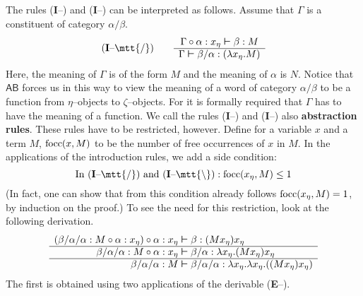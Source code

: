 The rules (\textbf{I}--{\mtt{\tf}}) and (\textbf{I}--{\mtt{\tb}}) 
can be interpreted as follows. Assume that $\Gamma$ is a constituent of
category $\alpha/\beta$. 
\begin{equation}
\mbox{\rm (\textbf{I}--{\mtt{\tf}})}\qquad
\begin{array}{c}
\Gamma \circ \alpha : x_{\eta} \bvdash \beta : M
    \\\hline
\Gamma \bvdash \beta/\alpha :
    (\lambda x_{\eta}. M)
\end{array} 
\end{equation}
Here, the meaning of $\Gamma$ is of the form $M$ and the
meaning of $\alpha$ is $N$. Notice that $\mathsf{AB}$ forces us 
in this way to view the meaning of a word of category $\alpha/\beta$ 
to be a function from $\eta$--objects to $\zeta$--objects.
For it is formally required that $\Gamma$ has to have the
meaning of a function. We call the rules (\textbf{I}--{\mtt{\tf}}) 
and (\textbf{I}--{\mtt{\tb}}) also \textbf{abstraction rules}.
These rules have to be restricted, however. Define for a variable 
$x$ and a term $M$, 
$\operatorname{focc}(x,M)$ to be the number of free occurrences of $x$ in $M$.
In the applications of the introduction rules, we add a side 
condition: 
\begin{equation}
\text{In }\mbox{\rm (\textbf{I}--{\mtt{\tf}})} \text{ and }
\mbox{\rm (\textbf{I}--{\mtt{\tb}})} : 
\focc(x_{\eta},M) \leq 1 
\end{equation}
(In fact, one can show that from this condition already follows 
$\operatorname{focc}(x_{\eta},M) = 1$, by induction on the proof.) To see the 
need for this restriction, look at the following derivation.
$$\begin{array}{r@{\;\bvdash\;}l}
(\beta/\alpha/\alpha : M \circ \alpha : x_{\eta}) \circ 
	\alpha : x_{\eta} & \beta : (Mx_{\eta})x_{\eta} \\\hline
\beta/\alpha/\alpha : M \circ \alpha : x_{\eta} & 
	\beta/\alpha : \lambda x_{\eta}.(Mx_{\eta})x_{\eta} \\\hline
\beta/\alpha/\alpha : M & 
	\beta/\alpha/\alpha : \lambda x_{\eta}.\lambda x_{\eta}.%
((Mx_{\eta})x_{\eta})
\end{array}$$
The first is obtained using two applications of the derivable 
(\textbf{E}--{\mtt{\tf}}). 

